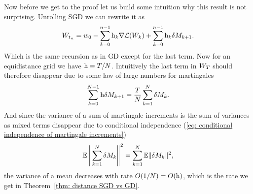 Now before we get to the proof let us build some intuition why this result
is not surprising. Unrolling SGD we can rewrite it as
\begin{align}\label{eq: unrolled SGD}
	W_{t_n}
	= w_0 - \sum_{k=0}^{n-1} \text{h}_k \nabla\mathcal{L}(W_k)
	+ \sum_{k=0}^{n-1} \text{h}_k\delta M_{k+1}.
\end{align}
Which is the same recursion as in GD except for the last term. Now for an
equidistance grid we have \(\text{h}=T/N\). Intuitively the last term in \(W_T\)
should therefore disappear due to some law of large numbers for martingales
\begin{align}\label{eq: mean of martingale increments}
	\sum_{k=0}^{N-1}\text{h}\delta M_{k+1} = \frac{T}{N}\sum_{k=1}^N\delta M_k.
\end{align}
And since the variance of a sum of martingale increments is the sum of variances
as mixed terms disappear due to conditional independence (\ref{eq: conditional
independence of martingale increments})
\begin{align*}
	\mathbb{E}\left\|\sum_{k=1}^N\delta M_k\right\|^2 = \sum_{k=1}^N \mathbb{E}\|\delta M_k\|^2,
\end{align*}
the variance of a mean decreases with rate \(O(1/N)=O(\text{h})\), which is the rate
we get in Theorem~\ref{thm: distance SGD vs GD}.
